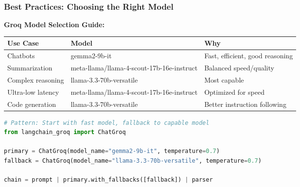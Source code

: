 \begin{frame}[fragile]\frametitle{Best Practices: Choosing the Right Model}

\textbf{Groq Model Selection Guide:}

\begin{center}
\begin{tabular}{|p{2cm}|p{3cm}|p{4cm}|}
\hline
\textbf{Use Case} & \textbf{Model} & \textbf{Why} \\
\hline
Chatbots & gemma2-9b-it & Fast, efficient, good reasoning \\
\hline
Summarization & meta-llama/llama-4-scout-17b-16e-instruct & Balanced speed/quality \\
\hline
Complex reasoning & llama-3.3-70b-versatile & Most capable \\
\hline
Ultra-low latency & meta-llama/llama-4-scout-17b-16e-instruct & Optimized for speed \\
\hline
Code generation & llama-3.3-70b-versatile & Better instruction following \\
\hline
\end{tabular}
\end{center}

\begin{lstlisting}[language=python, basicstyle=\tiny]
# Pattern: Start with fast model, fallback to capable model
from langchain_groq import ChatGroq

primary = ChatGroq(model_name="gemma2-9b-it", temperature=0.7)
fallback = ChatGroq(model_name="llama-3.3-70b-versatile", temperature=0.7)

chain = prompt | primary.with_fallbacks([fallback]) | parser
\end{lstlisting}

\end{frame}

